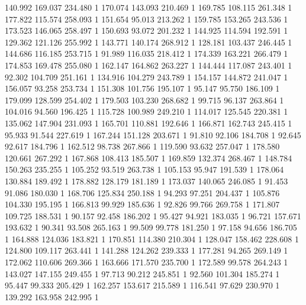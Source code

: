 	140.992	169.037	234.480	1
	170.074	143.093	210.469	1
	169.785	108.115	261.348	1
	177.822	115.574	258.093	1
	151.654	95.013	213.262	1
	159.785	153.265	243.536	1
	173.523	146.065	258.497	1
	150.693	93.072	201.232	1
	144.925	114.594	192.591	1
	129.362	121.126	255.992	1
	143.771	140.174	268.912	1
	128.181	103.437	246.445	1
	144.686	116.185	253.715	1
	91.989	116.035	218.412	1
	174.339	163.221	266.479	1
	174.853	169.478	255.080	1
	162.147	164.862	263.227	1
	144.444	117.087	243.401	1
	92.302	104.709	251.161	1
	134.916	104.279	243.789	1
	154.157	144.872	241.047	1
	156.057	93.258	253.734	1
	151.308	101.756	195.107	1
	95.147	95.750	186.109	1
	179.099	128.599	254.402	1
	179.503	103.230	268.682	1
	99.715	96.137	263.864	1
	104.016	94.560	196.425	1
	115.728	100.989	249.210	1
	114.017	125.545	220.381	1
	135.062	147.904	231.093	1
	165.701	110.881	192.646	1
	166.871	162.743	245.415	1
	95.933	91.544	227.619	1
	167.244	151.128	203.671	1
	91.810	92.106	184.708	1
	92.645	92.617	184.796	1
	162.512	98.738	267.866	1
	119.590	93.632	257.047	1
	178.580	120.661	267.292	1
	167.868	108.413	185.507	1
	169.859	132.374	268.467	1
	148.784	150.263	235.255	1
	105.252	93.519	263.738	1
	105.153	95.947	191.539	1
	178.064	130.884	189.492	1
	178.882	128.179	181.189	1
	173.037	140.065	246.085	1
	91.453	91.086	180.030	1
	168.706	125.834	250.188	1
	94.293	97.251	204.437	1
	105.876	104.330	195.195	1
	166.813	99.929	185.636	1
	92.826	99.766	269.758	1
	171.807	109.725	188.531	1
	90.157	92.458	186.202	1
	95.427	94.921	183.035	1
	96.721	157.671	193.632	1
	90.341	93.508	265.163	1
	99.509	99.778	181.250	1
	97.158	94.656	186.705	1
	164.888	124.036	183.821	1
	170.851	114.380	210.304	1
	128.047	158.462	228.608	1
	124.800	109.117	263.441	1
	141.288	124.262	239.333	1
	177.281	94.265	269.149	1
	172.062	110.606	269.366	1
	163.666	171.570	235.700	1
	172.589	99.578	264.243	1
	143.027	147.155	249.455	1
	97.713	90.212	245.851	1
	92.560	101.304	185.274	1
	95.447	99.333	205.429	1
	162.257	153.617	215.589	1
	116.541	97.629	230.970	1
	139.292	163.958	242.995	1
